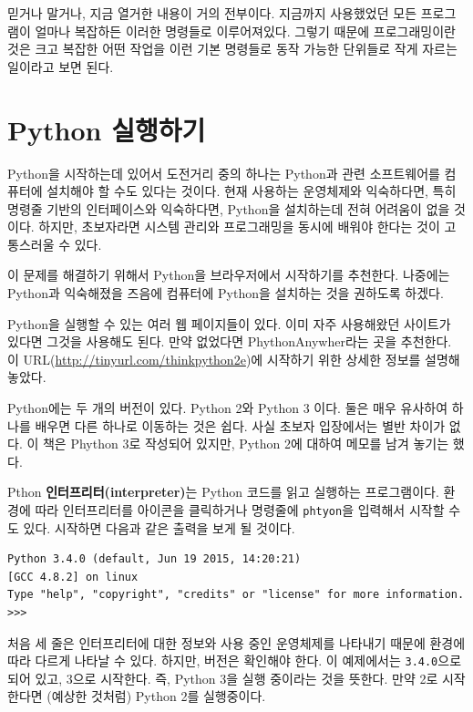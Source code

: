 \documentclass[10pt]{book}
\begin{document}
믿거나 말거나, 지금 열거한 내용이 거의 전부이다. 지금까지 사용했었던
모든 프로그램이 얼마나 복잡하든 이러한 명령들로 이루어져있다.  그렇기
때문에 프로그래밍이란 것은 크고 복잡한 어떤 작업을 이런 기본 명령들로
동작 가능한 단위들로 작게 자르는 일이라고 보면 된다.



\section{Python 실행하기}

Python을 시작하는데 있어서 도전거리 중의 하나는 Python과 관련
소프트웨어를 컴퓨터에 설치해야 할 수도 있다는 것이다.  현재 사용하는
운영체제와 익숙하다면, 특히 명령줄 기반의 인터페이스와 익숙하다면, Python을 설치하는데 전혀 어려움이 없을 것이다. 하지만, 초보자라면 시스템 관리와 프로그래밍을 동시에 배워야 한다는 것이 고통스러울 수 있다. 

이 문제를 해결하기 위해서 Python을 브라우저에서 시작하기를 추천한다. 나중에는 Python과 익숙해졌을 즈음에 컴퓨터에 Python을 설치하는 것을 권하도록 하겠다. 

Python을 실행할 수 있는 여러 웹 페이지들이 있다. 이미 자주 사용해왔던 사이트가 있다면 그것을 사용해도 된다. 만약 없었다면 PhythonAnywher라는 곳을 추천한다. 이 URL(\url{http://tinyurl.com/thinkpython2e})에 시작하기 위한 상세한 정보를 설명해 놓았다.

Python에는 두 개의 버전이 있다. Python 2와 Python 3 이다. 둘은 매우 유사하여 하나를 배우면 다른 하나로 이동하는 것은 쉽다. 사실 초보자 입장에서는 별반 차이가 없다. 이 책은 Phython 3로 작성되어 있지만, Python 2에 대하여 메모를 남겨 놓기는 했다. 

Pthon {\bf 인터프리터(interpreter)}는 Python 코드를 읽고 실행하는
프로그램이다.  환경에 따라 인터프리터를 아이콘을 클릭하거나 명령줄에
{\tt phtyon}을 입력해서 시작할 수도 있다.  시작하면 다음과 같은 출력을
보게 될 것이다. 

\begin{verbatim}
Python 3.4.0 (default, Jun 19 2015, 14:20:21) 
[GCC 4.8.2] on linux
Type "help", "copyright", "credits" or "license" for more information.
>>> 
\end{verbatim}
%
처음 세 줄은 인터프리터에 대한 정보와 사용 중인 운영체제를 나타내기
때문에 환경에 따라 다르게 나타날 수 있다. 하지만, 버전은 확인해야
한다. 이 예제에서는 {\tt 3.4.0}으로 되어 있고, 3으로 시작한다. 즉,
Python 3을 실행 중이라는 것을 뜻한다. 만약 2로 시작한다면 (예상한
것처럼) Python 2를 실행중이다.
\end{document}
